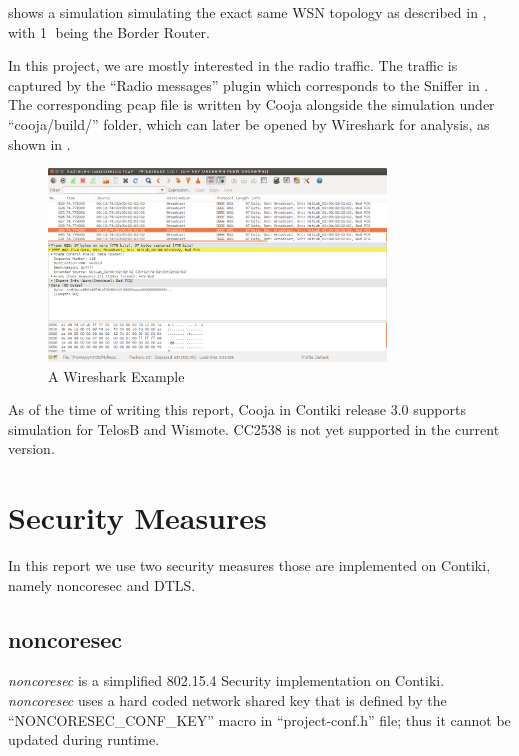  shows a simulation simulating the exact same WSN topology as described in , with \textcircled{1} being the Border Router. 

In this project, we are mostly interested in the radio traffic. The traffic is captured by the ``Radio messages'' plugin which corresponds to the Sniffer in . The corresponding pcap file is written by Cooja alongside the simulation under ``cooja/build/'' folder, which can later be opened by Wireshark\cite{Wireshark} for analysis, as shown in .

\begin{figure}[h!]
	\center
	\includegraphics[width=0.8\textwidth]{fig/wireshark_example.png}
	\caption{A Wireshark Example}
	\label{Fig: A Wireshark Example}
\end{figure}

As of the time of writing this report, Cooja in Contiki release 3.0 supports simulation for TelosB and Wismote. CC2538 is not yet supported in the current version.

\section{Security Measures}

In this report we use two security measures those are implemented on Contiki, namely noncoresec and DTLS.

\subsection{noncoresec}

\textit{noncoresec}\cite{noncoresec}\cite{LLSEC} is a simplified 802.15.4 Security implementation on Contiki. \textit{noncoresec} uses a hard coded network shared key that is defined by the ``NONCORESEC\_CONF\_KEY'' macro in ``project-conf.h'' file; thus it cannot be updated during runtime. 

